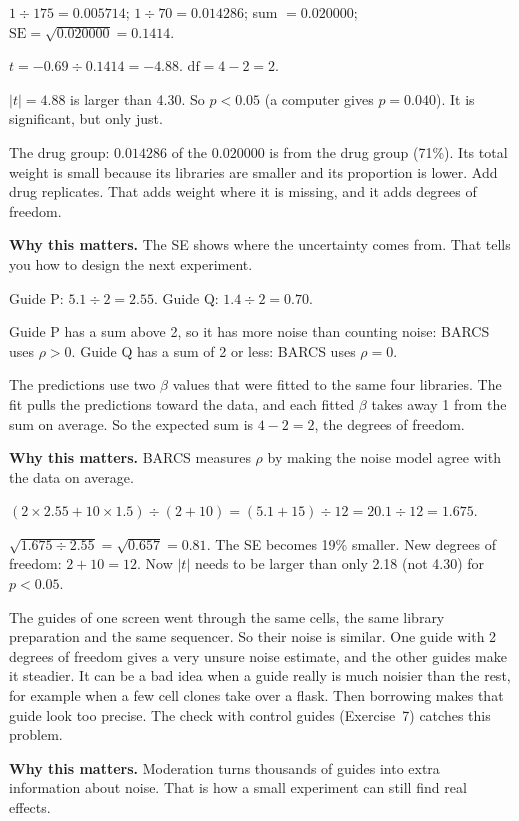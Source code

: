 \documentclass[12pt]{article}
\newcommand{\why}[1]{\par\smallskip\noindent\textcolor{barcsgreen!70!black}{\textbf{Why this matters.}} #1}
\begin{document}
\begin{exlist}[resume]
\item
\begin{parts}
\item $1 \div 175 = 0.005714$; $1 \div 70 = 0.014286$; sum $= 0.020000$;
  $\text{SE} = \sqrt{0.020000} = 0.1414$.
\item $t = -0.69 \div 0.1414 = -4.88$. $\text{df} = 4 - 2 = 2$.
\item $|t| = 4.88$ is larger than 4.30. So $p < 0.05$ (a computer gives
  $p = 0.040$). It is significant, but only just.
\item The drug group: $0.014286$ of the $0.020000$ is from the drug group
  (71\%). Its total weight is small because its libraries are smaller and
  its proportion is lower. Add drug replicates. That adds weight where it is
  missing, and it adds degrees of freedom.
\end{parts}
\why{The SE shows where the uncertainty comes from. That tells you how to
design the next experiment.}

\item
\begin{parts}
\item Guide P: $5.1 \div 2 = 2.55$. Guide Q: $1.4 \div 2 = 0.70$.
\item Guide P has a sum above 2, so it has more noise than counting noise:
  BARCS uses $\rho > 0$. Guide Q has a sum of 2 or less: BARCS uses
  $\rho = 0$.
\item The predictions use two $\beta$ values that were fitted to the same
  four libraries. The fit pulls the predictions toward the data, and each
  fitted $\beta$ takes away 1 from the sum on average. So the expected sum
  is $4 - 2 = 2$, the degrees of freedom.
\end{parts}
\why{BARCS measures $\rho$ by making the noise model agree with the data on
average.}

\item
\begin{parts}
\item $(2 \times 2.55 + 10 \times 1.5) \div (2 + 10) = (5.1 + 15) \div 12 =
  20.1 \div 12 = 1.675$.
\item $\sqrt{1.675 \div 2.55} = \sqrt{0.657} = 0.81$. The SE becomes 19\%
  smaller. New degrees of freedom: $2 + 10 = 12$. Now $|t|$ needs to be
  larger than only 2.18 (not 4.30) for $p < 0.05$.
\item The guides of one screen went through the same cells, the same
  library preparation and the same sequencer. So their noise is similar. One
  guide with 2 degrees of freedom gives a very unsure noise estimate, and
  the other guides make it steadier. It can be a bad idea when a guide
  really is much noisier than the rest, for example when a few cell clones
  take over a flask. Then borrowing makes that guide look too precise. The
  check with control guides (Exercise~7) catches this problem.
\end{parts}
\why{Moderation turns thousands of guides into extra information about
noise. That is how a small experiment can still find real effects.}
\end{exlist}
\end{document}
